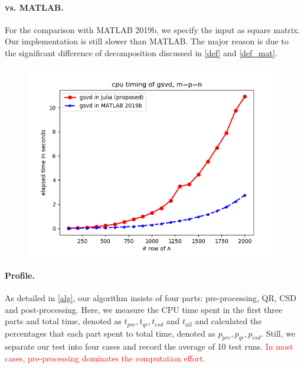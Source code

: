         \paragraph{vs. MATLAB.}
        For the comparison with MATLAB 2019b, we specify the input as square matrix. Our implementation is still slower than MATLAB. The major reason is due to the significant difference of decomposition discussed in \ref{def} and \ref{def_mat}. 
        
        \begin{figure}[H]
            \centering
            \includegraphics[width=0.65\linewidth]{fig/julia_matlab_m=p=n.png}
            \label{julia_matlab}
        \end{figure}
    
    \newpage
    
    \paragraph{Profile.}
    As detailed in \ref{alg}, our algorithm insists of four parts: pre-processing, QR, CSD and post-processing. Here, we measure the CPU time spent in the first three parts and total time, denoted as $t_{pre}, t_{qr}, t_{csd}$ and   $t_{all}$ and calculated the percentages that each part spent to total time, denoted as $p_{pre}, p_{qr}, p_{csd}$. Still, we separate our test into four cases and record the average of 10 test runs. \textcolor{red}{In most cases, pre-processing dominates the computation effort}. 
    
